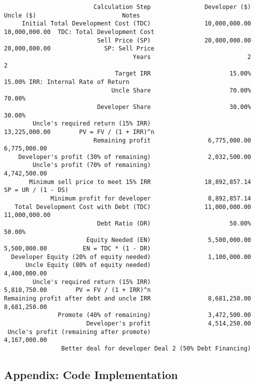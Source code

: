 \documentclass[a1paper]{article}
\begin{document}
\begin{lstlisting}
                         Calculation Step               Developer ($)     Uncle ($)                        Notes
     Initial Total Development Cost (TDC)               10,000,000.00 10,000,000.00  TDC: Total Development Cost
                          Sell Price (SP)               20,000,000.00 20,000,000.00               SP: Sell Price
                                    Years                           2             2
                               Target IRR                      15.00%        15.00% IRR: Internal Rate of Return
                              Uncle Share                      70.00%        70.00%
                          Developer Share                      30.00%        30.00%
        Uncle's required return (15% IRR)                             13,225,000.00        PV = FV / (1 + IRR)^n
                         Remaining profit                6,775,000.00  6,775,000.00
    Developer's profit (30% of remaining)                2,032,500.00
        Uncle's profit (70% of remaining)                              4,742,500.00
       Minimum sell price to meet 15% IRR               18,892,857.14                         SP = UR / (1 - DS)
             Minimum profit for developer                8,892,857.14
   Total Development Cost with Debt (TDC)               11,000,000.00 11,000,000.00
                          Debt Ratio (DR)                      50.00%        50.00%
                       Equity Needed (EN)                5,500,000.00  5,500,000.00          EN = TDC * (1 - DR)
  Developer Equity (20% of equity needed)                1,100,000.00
      Uncle Equity (80% of equity needed)                              4,400,000.00
        Uncle's required return (15% IRR)                              5,818,750.00        PV = FV / (1 + IRR)^n
Remaining profit after debt and uncle IRR                8,681,250.00  8,681,250.00
               Promote (40% of remaining)                3,472,500.00
                       Developer's profit                4,514,250.00
 Uncle's profit (remaining after promote)                              4,167,000.00
                Better deal for developer Deal 2 (50% Debt Financing)
\end{lstlisting}

\subsection*{Appendix: Code Implementation}
\end{document}
